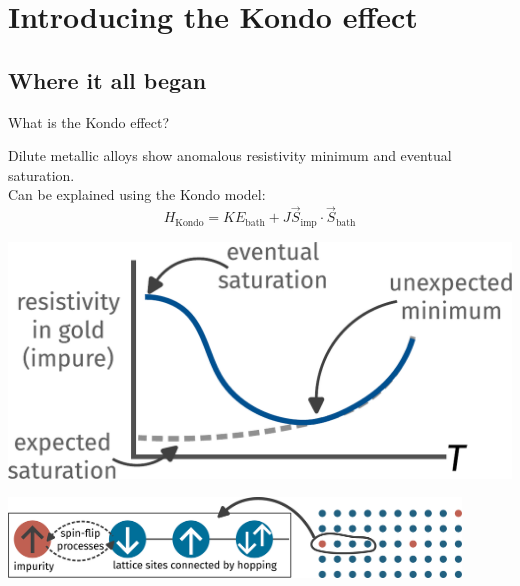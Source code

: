 \documentclass[aspectratio=169]{beamer}
\begin{document}
\section{Introducing the Kondo effect}
\subsection{Where it all began}

\begin{frame}{What is the Kondo effect?}
\begin{minipage}{0.5\textwidth}
Dilute metallic alloys show anomalous resistivity \alert{minimum} and eventual saturation.\\[10pt]
Can be explained using the \alert{Kondo model}:
\[H_\text{Kondo} = KE_\text{bath} + J \vec{S}_\text{imp}\cdot\vec{S}_\text{bath}\]
\end{minipage}
\hspace*{\fill}
\begin{minipage}{0.45\textwidth}
\centering
\includegraphics[width=\textwidth]{resistance_minimum.pdf}
\end{minipage}

\begin{center}
\includegraphics[width=0.9\textwidth]{KondoModel.pdf}
\end{center}


\end{frame}
\end{document}
